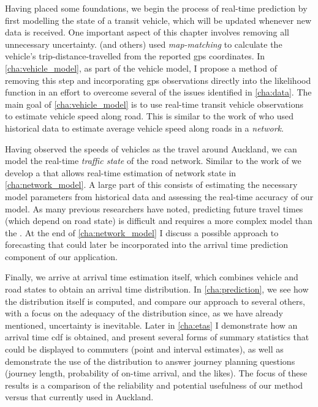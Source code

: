 Having placed some foundations, we begin the process of real-time prediction by first modelling the state of a transit vehicle, which will be updated whenever new data is received. One important aspect of this chapter involves removing all unnecessary uncertainty.  (and others) used \emph{map-matching} to calculate the vehicle's trip-distance-travelled from the reported \gls{gps} coordinates. In \cref{cha:vehicle_model}, as part of the vehicle model, I propose a method of removing this step and incorporating \gls{gps} observations directly into the likelihood function in an effort to overcome several of the issues identified in \cref{cha:data}. The main goal of \cref{cha:vehicle_model} is to use real-time transit vehicle observations to estimate vehicle speed along road. This is similar to the work of \citet{Celan_2017,Celan_2018} who used historical data to estimate average vehicle speed along roads in a \emph{network}.


Having observed the speeds of vehicles as the travel around Auckland, we can model the real-time \emph{traffic state} of the road network. Similar to the work of \citet{Shalaby_2004} we develop a \kf{} that allows real-time estimation of network state in \cref{cha:network_model}. A large part of this consists of estimating the necessary model parameters from historical data and assessing the real-time accuracy of our model. As many previous researchers have noted, predicting future travel times (which depend on road state) is difficult and requires a more complex model than the \kf{}. At the end of \cref{cha:network_model} I discuss a possible approach to forecasting that could later be incorporated into the arrival time prediction component of our application.


Finally, we arrive at arrival time estimation itself, which combines vehicle and road states to obtain an arrival time distribution. In \cref{cha:prediction}, we see how the distribution itself is computed, and compare our approach to several others, with a focus on the adequacy of the distribution since, as we have already mentioned, uncertainty is inevitable. Later in \cref{cha:etas} I demonstrate how an arrival time \gls{cdf} is obtained, and present several forms of summary statistics that could be displayed to commuters (point and interval estimates), as well as demonstrate the use of the distribution to answer journey planning questions (journey length, probability of on-time arrival, and the likes). The focus of these results is a comparison of the reliability and potential usefulness of our method versus that currently used in Auckland.


